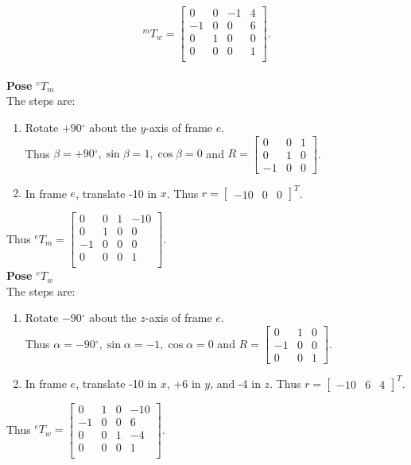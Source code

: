 \documentclass[12pt,letterpaper]{article}
\newcommand{\rca}{\cos\alpha} \newcommand{\rcb}{\cos\beta} \newcommand{\rcg}{\cos\gamma}
\newcommand{\rsa}{\sin\alpha} \newcommand{\rsb}{\sin\beta} \newcommand{\rsg}{\sin\gamma}
\newcommand{\degsym}{\ensuremath{^{\circ}}}
\begin{document}
\begin{enumerate}
\begin{equation*}
^{m}T_w = \begin{bmatrix}
 0 & 0 & -1 & 4\\
-1 & 0 &  0 & 6\\
 0 & 1 &  0 & 0\\
 0 & 0 &  0 & 1\\
\end{bmatrix}.
\end{equation*}
\\
\textbf{Pose $^{e}T_m$}\\
The steps are:
\begin{enumerate}
\item Rotate $+90\degsym$ about the $y$-axis of frame $e$.\\
Thus $\beta = +90\degsym, \rsb = 1, \rcb = 0$ and 
$R = \begin{bmatrix} 0 & 0 & 1 \\ 0 & 1 & 0 \\ -1 & 0 & 0 \end{bmatrix}$.
\item In frame $e$, translate -10 in $x$. Thus $r = \begin{bmatrix} -10 & 0 & 0 \end{bmatrix}^T$.
\end{enumerate}
Thus $^{e}T_m = \begin{bmatrix}
 0 & 0 & 1 & -10\\
 0 & 1 & 0 &   0\\
-1 & 0 & 0 &   0\\
 0 & 0 & 0 &   1\\
\end{bmatrix}$.
\\
\textbf{Pose $^{e}T_w$}\\
The steps are:
\begin{enumerate}
\item Rotate $-90\degsym$ about the $z$-axis of frame $e$.\\
Thus $\alpha = -90\degsym, \rsa = -1, \rca = 0$ and 
$R = \begin{bmatrix} 0 & 1 & 0 \\ -1 & 0 & 0 \\ 0 & 0 & 1 \end{bmatrix}$.
\item In frame $e$, translate -10 in $x$, +6 in $y$, and -4 in $z$. Thus $r = \begin{bmatrix} -10 & 6 & 4 \end{bmatrix}^T$.
\end{enumerate}
Thus $^{e}T_w = \begin{bmatrix}
 0 & 1 & 0 & -10\\
-1 & 0 & 0 &   6\\
 0 & 0 & 1 &  -4\\
 0 & 0 & 0 &   1\\
\end{bmatrix}$.


\end{enumerate}
\end{document}
